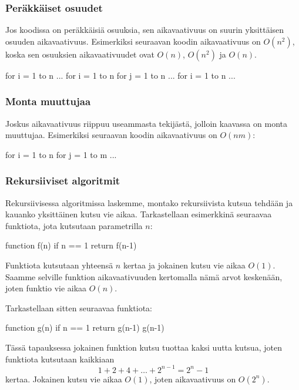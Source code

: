 \subsubsection{Peräkkäiset osuudet}

Jos koodissa on peräkkäisiä osuuksia, sen aikavaativuus on suurin
yksittäisen osuuden aikavaativuus. Esimerkiksi seuraavan koodin aikavaativuus on $O(n^2)$,
koska sen osuuksien aikavaativuudet ovat $O(n)$, $O(n^2)$ ja $O(n)$.

\begin{code}
for i = 1 to n
    ...
for i = 1 to n
    for j = 1 to n
        ...
for i = 1 to n
    ...
\end{code}

\subsubsection{Monta muuttujaa}

Joskus aikavaativuus riippuu useammasta tekijästä,
jolloin kaavassa on monta muuttujaa.
Esimerkiksi seuraavan koodin aikavaativuus on $O(nm)$:

\begin{code}
for i = 1 to n
    for j = 1 to m
        ...
\end{code}

\subsubsection{Rekursiiviset algoritmit}

Rekursiivisessa algoritmissa laskemme,
montako rekursiivista kutsua teh\-dään ja kauanko
yksittäinen kutsu vie aikaa.
Tarkastellaan esimerkkinä seuraavaa
funktiota, jota kutsutaan parametrilla $n$:

\begin{code}
function f(n)
    if n == 1
        return
    f(n-1)
\end{code}

Funktiota kutsutaan yhteensä $n$ kertaa ja jokainen kutsu vie aikaa $O(1)$.
Saamme selville funktion aikavaativuuden kertomalla nämä arvot keskenään,
joten funktio vie aikaa $O(n)$.

Tarkastellaan sitten seuraavaa funktiota:

\begin{code}
function g(n)
    if n == 1
        return
    g(n-1)
    g(n-1)
\end{code}

Tässä tapauksessa jokainen funktion kutsu tuottaa kaksi uutta kutsua,
joten funktiota kutsutaan kaikkiaan
\[1+2+4+\dots+2^{n-1}=2^n-1\]
kertaa. Jokainen kutsu vie aikaa $O(1)$,
joten aikavaativuus on $O(2^n)$.

